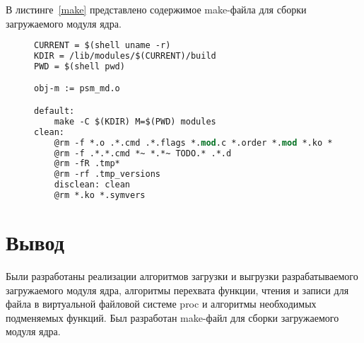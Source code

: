 В листинге~\ref{make} представлено содержимое make-файла для сборки загружаемого модуля ядра.
\begin{figure}[H]
	\begin{lstlisting}[label=make,caption=Make-файл для сборки загружаемого модуля ядра,language=Caml]
CURRENT = $(shell uname -r)
KDIR = /lib/modules/$(CURRENT)/build
PWD = $(shell pwd)

obj-m := psm_md.o

default: 
	make -C $(KDIR) M=$(PWD) modules 
clean: 
	@rm -f *.o .*.cmd .*.flags *.mod.c *.order *.mod *.ko *.symvers 
	@rm -f .*.*.cmd *~ *.*~ TODO.* .*.d
	@rm -fR .tmp* 
	@rm -rf .tmp_versions 
	disclean: clean 
	@rm *.ko *.symvers
	\end{lstlisting}
\end{figure}

\section*{Вывод}

Были разработаны реализации алгоритмов загрузки и выгрузки разрабатываемого загружаемого модуля ядра, алгоритмы перехвата функции, чтения и записи для файла в виртуальной файловой системе proc и алгоритмы необходимых подменяемых функций.
Был разработан make-файл для сборки загружаемого модуля ядра.

\clearpage